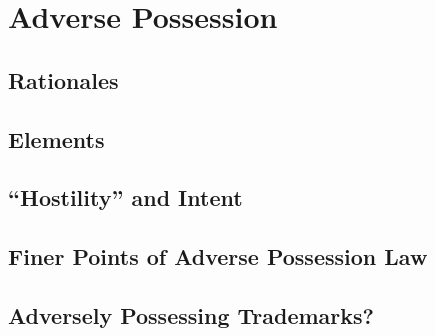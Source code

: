 \chapter{Adverse Possession}



\section{Rationales}





\section{Elements}



\begin{questions}

\end{questions}



\section{``Hostility'' and Intent}





%

\begin{questions}

\end{questions}

\section{Finer Points of Adverse Possession Law}





\section{Adversely Possessing Trademarks?}




\begin{questions}

\end{questions}

